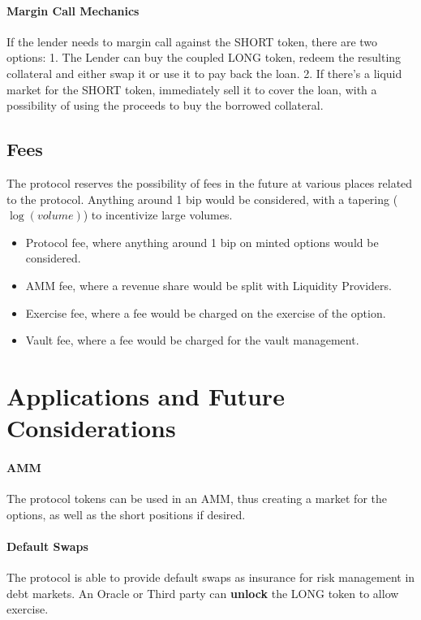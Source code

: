 \paragraph*{Margin Call Mechanics}
If the lender needs to margin call against the SHORT token, there are two options: 1. The Lender can buy the coupled LONG token, redeem the resulting collateral and either swap it or use it to pay back the loan. 2. If there's a liquid market for the SHORT token, immediately sell it to cover the loan, with a possibility of using the proceeds to buy the borrowed collateral.

\subsection{Fees}
The protocol reserves the possibility of fees in the future at various places related to the protocol.
Anything around 1 bip would be considered, with a tapering ($\log(volume)$) to incentivize large volumes.
\begin{itemize}
  \setlength{\itemsep}{0pt}
  \setlength{\parskip}{0pt}
  \item Protocol fee, where anything around 1 bip on minted options would be considered.
  \item AMM fee, where a revenue share would be split with Liquidity Providers.
  \item Exercise fee, where a fee would be charged on the exercise of the option.
  \item Vault fee, where a fee would be charged for the vault management.
\end{itemize}


\section{Applications and Future Considerations}
\paragraph*{AMM}
The protocol tokens can be used in an AMM, thus creating a market for the options, as well as the short positions if desired. 

\paragraph*{Default Swaps}

The protocol is able to provide default swaps as insurance for risk management in debt markets. 
An Oracle or Third party can \textbf{unlock} the LONG token to allow exercise.

